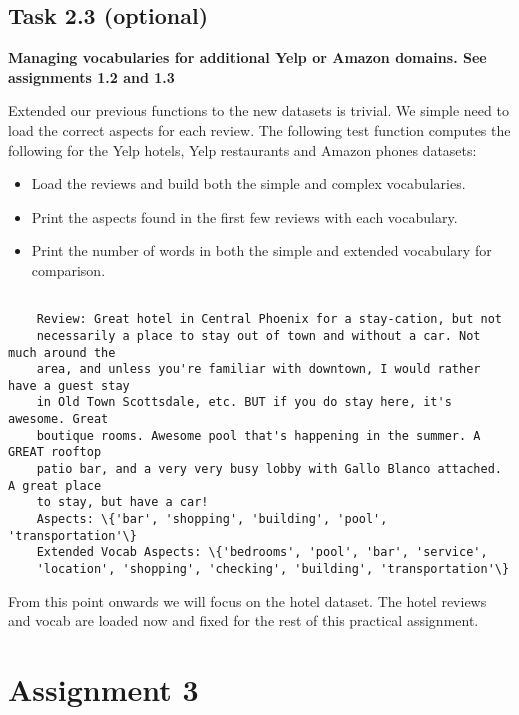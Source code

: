 \documentclass[11pt]{article}
\providecommand{\tightlist}{%
      \setlength{\itemsep}{0pt}\setlength{\parskip}{0pt}}
\begin{document}
\hypertarget{task-2.3-optional}{%
    \subsection{Task 2.3 (optional)}\label{task-2.3-optional}}

\textbf{Managing vocabularies for additional Yelp or Amazon domains. See
    assignments 1.2 and 1.3}

Extended our previous functions to the new datasets is trivial. We
simple need to load the correct aspects for each review. The following
test function computes the following for the Yelp hotels, Yelp
restaurants and Amazon phones datasets:

\begin{itemize}
    \tightlist
    \item
          Load the reviews and build both the simple and complex vocabularies.
    \item
          Print the aspects found in the first few reviews with each vocabulary.
    \item
          Print the number of words in both the simple and extended vocabulary
          for comparison.
\end{itemize}

\begin{Verbatim}[commandchars=\\\{\}]

    Review: Great hotel in Central Phoenix for a stay-cation, but not
    necessarily a place to stay out of town and without a car. Not much around the
    area, and unless you're familiar with downtown, I would rather have a guest stay
    in Old Town Scottsdale, etc. BUT if you do stay here, it's awesome. Great
    boutique rooms. Awesome pool that's happening in the summer. A GREAT rooftop
    patio bar, and a very very busy lobby with Gallo Blanco attached. A great place
    to stay, but have a car!
    Aspects: \{'bar', 'shopping', 'building', 'pool', 'transportation'\}
    Extended Vocab Aspects: \{'bedrooms', 'pool', 'bar', 'service',
    'location', 'shopping', 'checking', 'building', 'transportation'\}

\end{Verbatim}

From this point onwards we will focus on the hotel dataset. The hotel
reviews and vocab are loaded now and fixed for the rest of this
practical assignment.



\hypertarget{assignment-3}{%
    \section{Assignment 3}\label{assignment-3}}
\end{document}
